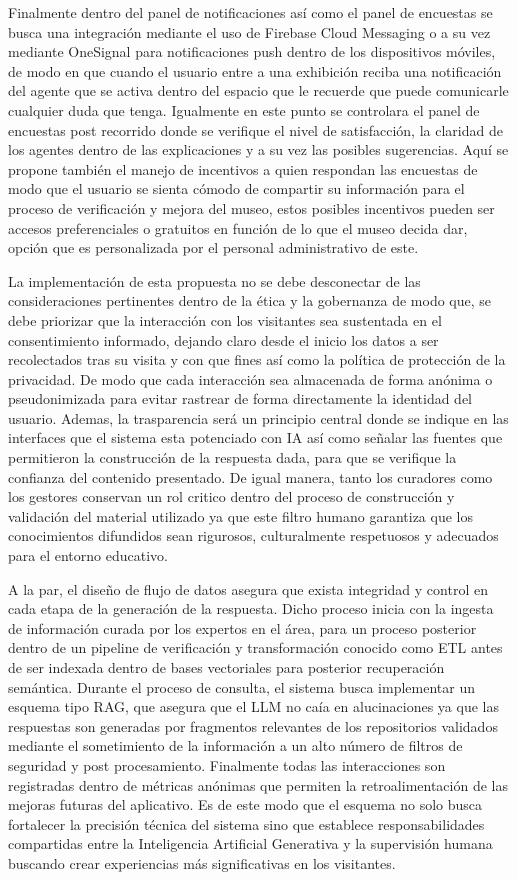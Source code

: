 \documentclass[pdflatex,sn-mathphys-num]{sn-jnl}%
\theoremstyle{thmstyleone}%
\theoremstyle{thmstyletwo}%
\theoremstyle{thmstylethree}%
\begin{document}
Finalmente dentro del panel de notificaciones así como el panel de encuestas se busca una integración mediante el uso de Firebase Cloud Messaging o a su vez mediante OneSignal para notificaciones push dentro de los dispositivos móviles, de modo en que cuando el usuario entre a una exhibición reciba una notificación del agente que se activa dentro del espacio que le recuerde que puede comunicarle cualquier duda que tenga. Igualmente en este punto se controlara el panel de encuestas post recorrido donde se verifique el nivel de satisfacción, la claridad de los agentes dentro de las explicaciones y a su vez las posibles sugerencias. Aquí se propone también el manejo de incentivos a quien respondan las encuestas de modo que el usuario se sienta cómodo de compartir su información para el proceso de verificación y mejora del museo, estos posibles incentivos pueden ser accesos preferenciales o gratuitos en función de lo que el museo decida dar, opción que es personalizada por el personal administrativo de este.

La implementación de esta propuesta no se debe desconectar de las consideraciones pertinentes dentro de la ética y la gobernanza de modo que, se debe priorizar que la interacción con los visitantes sea sustentada en el consentimiento informado, dejando claro desde el inicio los datos a ser recolectados tras su visita y con que fines así como la política de protección de la privacidad. De modo que cada interacción sea almacenada de forma anónima o pseudonimizada para evitar rastrear de forma directamente la identidad del usuario. Ademas, la trasparencia será un principio central donde se indique en las interfaces que el sistema esta potenciado con IA así como señalar las fuentes que permitieron la construcción de la respuesta dada, para que se verifique la confianza del contenido presentado. De igual manera, tanto los curadores como los gestores conservan un rol critico dentro del proceso de construcción y validación del material utilizado ya que este filtro humano garantiza que los conocimientos difundidos sean rigurosos, culturalmente respetuosos y adecuados para el entorno educativo.

A la par, el diseño de flujo de datos asegura que exista integridad y control en cada etapa de la generación de la respuesta. Dicho proceso inicia con la ingesta de información curada por los expertos en el área, para un proceso posterior dentro de un pipeline de verificación y transformación conocido como ETL antes de ser indexada dentro de bases vectoriales para posterior recuperación semántica. Durante el proceso de consulta, el sistema busca implementar un esquema tipo RAG, que asegura que el LLM no caía en alucinaciones ya que las respuestas son generadas por fragmentos relevantes de los repositorios validados mediante el sometimiento de la información a un alto número de filtros de seguridad y post procesamiento. Finalmente todas las interacciones son registradas dentro de métricas anónimas que permiten la retroalimentación de las mejoras futuras del aplicativo. Es de este modo que el esquema no solo busca fortalecer la precisión técnica del sistema sino que establece responsabilidades compartidas entre la Inteligencia Artificial Generativa y la supervisión humana buscando crear experiencias más significativas en los visitantes.
\end{document}

